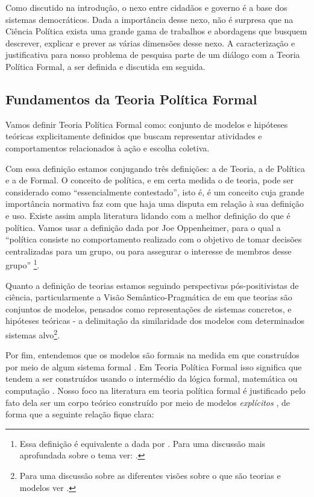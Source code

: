 
Como discutido na introdução, o nexo entre cidadãos e governo é a base dos
sistemas democráticos. Dada a importância desse nexo, não é surpresa que na
Ciência Política exista uma grande gama de trabalhos e abordagens que busquem
descrever, explicar e prever as várias dimensões desse nexo. A caracterização e
justificativa para nosso problema de pesquisa parte de um diálogo com a Teoria
Política Formal, a ser definida e discutida em seguida.

\subsection{Fundamentos da Teoria Política Formal}

Vamos definir Teoria Política Formal como: conjunto de modelos e hipóteses
teóricas explicitamente definidos que buscam representar atividades e
comportamentos relacionados à ação e escolha coletiva.

Com essa definição estamos conjugando três definições: a de Teoria, a de
Política e a de Formal. O conceito de política, e em certa medida o de teoria,
pode ser considerado como ``essencialmente contestado'', isto é, é um conceito
cuja grande importância normativa faz com que haja uma disputa em relação à sua
definição e uso\cite{collier2006essentially}. Existe assim ampla literatura
lidando com a melhor definição do que é política. Vamos usar a definição
dada por Joe Oppenheimer, para o qual  a ``política consiste
no comportamento realizado com o objetivo de tomar decisões centralizadas para
um grupo, ou para assegurar o interesse de membros desse grupo'' \cite[p.
I]{oppenheimer2012principles}\footnote{Essa definição é equivalente a dada por
  . Para uma discussão mais aprofundada sobre o
  tema ver: .}.

Quanto a definição de teorias estamos seguindo perspectivas pós-positivistas de
ciência, particularmente a Visão Semântico-Pragmática de
 em que teorias são conjuntos de modelos, pensados
como representações de sistemas concretos, e hipóteses teóricas - a delimitação
da similaridade dos modelos com determinados sistemas alvo\footnote{Para uma
  discussão sobre as diferentes visões sobre o que são teorias e modelos ver
  .}.

Por fim, entendemos que os modelos são formais na medida em que construídos por
meio de algum sistema formal \cite{wong2015formal}. Em Teoria Política Formal
isso significa que tendem a ser construídos usando o intermédio da lógica formal,
matemática ou computação \cite{morton1999methods}. Nosso foco na literatura em
teoria política formal é justificado pelo fato dela ser um corpo teórico
construído por meio de modelos \textit{explícitos} \cite{epstein2008model}, de
forma que a seguinte relação fique clara:

